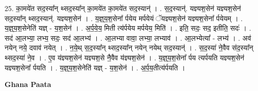 \documentclass[17pt]{extarticle}
\begin{document}
25. का॒मये॑त सद॒स्या᳚न् थ्सद॒स्या᳚न् का॒मये॑त का॒मये॑त सद॒स्यान्॑ । . स॒द॒स्यान्॑. यज्ञ्यश॒सेन॑ यज्ञ्यश॒सेन॑ सद॒स्या᳚न् थ्सद॒स्यान्॑. यज्ञ्यश॒सेन॑ । . य॒ज्ञ्॒य॒श॒सेना᳚ र्पयेय मर्पयेयं ॅयज्ञ्यश॒सेन॑ यज्ञ्यश॒सेना᳚ र्पयेयम् । . य॒ज्ञ्॒य॒श॒सेनेति॑ यज्ञ् - य॒श॒सेन॑ । . अ॒र्प॒ये॒य॒ मिती त्य॑र्पयेय मर्पयेय॒ मिति॑ । . इति॒ सदः॒ सद॒ इतीति॒ सदः॑ । . सद॑ आ॒लभ्या॒ लभ्य॒ सदः॒ सद॑ आ॒लभ्य॑ । . आ॒लभ्या वावा॒ लभ्या॒ लभ्याव॑ । . आ॒लभ्येत्या᳚ - लभ्य॑ । . अव॑ नयेन् नये॒ दवाव॑ नयेत् । . न॒ये॒थ् स॒द॒स्या᳚न् थ्सद॒स्या᳚न् नयेन् नयेथ् सद॒स्यान्॑ । . स॒द॒स्या॑ ने॒वैव स॑द॒स्या᳚न् थ्सद॒स्या॑ ने॒व । . ए॒व य॑ज्ञ्यश॒सेन॑ यज्ञ्यश॒से नै॒वैव य॑ज्ञ्यश॒सेन॑ । . य॒ज्ञ्॒य॒श॒सेना᳚ र्पय त्यर्पयति यज्ञ्यश॒सेन॑ यज्ञ्यश॒सेना᳚ र्पयति । . य॒ज्ञ्॒य॒श॒सेनेति॑ यज्ञ् - य॒श॒सेन॑ । . अ॒र्प॒य॒तीत्य॑र्पयति । \newline

\textbf{Ghana Paata } \newline
\end{document}

